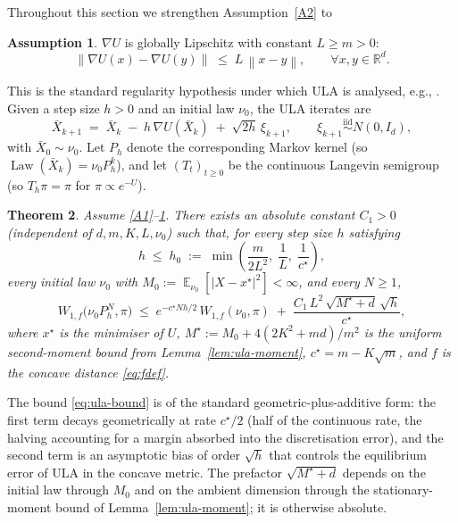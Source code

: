 \documentclass[11pt]{article}
\newtheorem{theorem}{Theorem}
\theoremstyle{definition}
\newtheorem{assumption}[theorem]{Assumption}
\DeclareMathOperator{\E}{\mathbb{E}}
\DeclareMathOperator{\Law}{Law}
\newcommand{\R}{\mathbb{R}}
\newcommand{\norm}[1]{\left\lVert #1 \right\rVert}
\newcommand{\abs}[1]{\left\lvert #1 \right\rvert}
\begin{document}
Throughout this section we strengthen Assumption~\ref{A2} to
\begin{assumption}\label{A4}
$\nabla U$ is globally Lipschitz with constant $L \ge m > 0$:
\[
\norm{\nabla U(x) - \nabla U(y)} \;\le\; L\,\norm{x - y}, \qquad \forall x, y \in \R^d.
\]
\end{assumption}
This is the standard regularity hypothesis under which ULA is analysed, e.g., \cite{DurmusMoulines2019,Dalalyan2017}. Given a step size $h > 0$ and an initial law $\nu_0$, the ULA iterates are
\begin{equation}\label{eq:ula}
\bar X_{k+1} \;=\; \bar X_k \;-\; h\,\nabla U(\bar X_k) \;+\; \sqrt{2h}\,\xi_{k+1}, \qquad \xi_{k+1} \stackrel{\text{iid}}{\sim} N(0, I_d),
\end{equation}
with $\bar X_0 \sim \nu_0$. Let $P_h$ denote the corresponding Markov kernel (so $\Law(\bar X_k) = \nu_0 P_h^k$), and let $(T_t)_{t \ge 0}$ be the continuous Langevin semigroup (so $T_h \pi = \pi$ for $\pi \propto e^{-U}$).

\begin{theorem}\label{thm:ula}
Assume \ref{A1}--\ref{A4}. There exists an absolute constant $C_1 > 0$ (independent of $d, m, K, L, \nu_0$) such that, for every step size $h$ satisfying
\begin{equation}\label{eq:h0}
h \;\le\; h_0 \;:=\; \min\!\left(\frac{m}{2 L^2},\; \frac{1}{L},\; \frac{1}{c^\star}\right),
\end{equation}
every initial law $\nu_0$ with $M_0 := \E_{\nu_0}[\abs{X - x^\star}^2] < \infty$, and every $N \ge 1$,
\begin{equation}\label{eq:ula-bound}
W_{1,f}\bigl(\nu_0 P_h^N, \pi\bigr) \;\le\; e^{-c^\star N h / 2}\,W_{1,f}(\nu_0, \pi) \;+\; \frac{C_1\, L^2\,\sqrt{M^\star + d}\,\sqrt h}{c^\star},
\end{equation}
where $x^\star$ is the minimiser of $U$, $M^\star := M_0 + 4(2K^2 + md)/m^2$ is the uniform second-moment bound from Lemma~\ref{lem:ula-moment}, $c^\star = m - K\sqrt m$, and $f$ is the concave distance \eqref{eq:fdef}.
\end{theorem}

The bound \eqref{eq:ula-bound} is of the standard geometric-plus-additive form: the first term decays geometrically at rate $c^\star/2$ (half of the continuous rate, the halving accounting for a margin absorbed into the discretisation error), and the second term is an asymptotic bias of order $\sqrt h$ that controls the equilibrium error of ULA in the concave metric. The prefactor $\sqrt{M^\star + d}$ depends on the initial law through $M_0$ and on the ambient dimension through the stationary-moment bound of Lemma~\ref{lem:ula-moment}; it is otherwise absolute.
\end{document}
